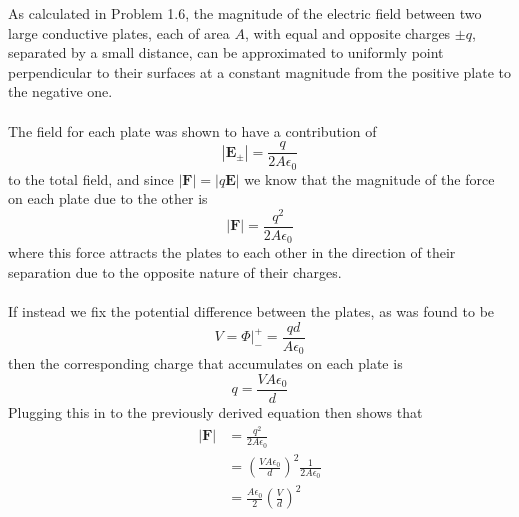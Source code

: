 \documentclass{article}
\begin{document}
As calculated in Problem 1.6, the magnitude of the electric field between two large conductive plates, each of area $A$, with equal and opposite charges $\pm q$, separated by a small distance, can be approximated to uniformly point perpendicular to their surfaces at a constant magnitude from the positive plate to the negative one.\\
\\
The field for each plate was shown to have a contribution of
\[ \left|\mathbf{E}_{\pm}\right| = \frac{q}{2A\epsilon_{0}} \]
to the total field, and since $\left| \mathbf{F} \right| = \left| q\mathbf{E} \right|$ we know that the magnitude of the force on each plate due to the other is
\[ \left| \mathbf{F} \right| = \boxed{\frac{q^{2}}{2A\epsilon_{0}}} \]
where this force attracts the plates to each other in the direction of their separation due to the opposite nature of their charges.\\
\\
If instead we fix the potential difference between the plates, as was found to be
\[ V = \Phi\rvert_{-}^{+} = \frac{qd}{A\epsilon_{0}} \]
then the corresponding charge that accumulates on each plate is
\[ q = \frac{VA\epsilon_{0}}{d} \]
Plugging this in to the previously derived equation then shows that
\begin{align*}
\left| \mathbf{F} \right| &= \frac{q^{2}}{2A\epsilon_{0}}\\
&= \left( \frac{VA\epsilon_{0}}{d} \right)^{2} \frac{1}{2A\epsilon_{0}}\\
&= \boxed{\frac{A\epsilon_{0}}{2} \left( \frac{V}{d} \right)^{2}}
\end{align*}
\end{document}
